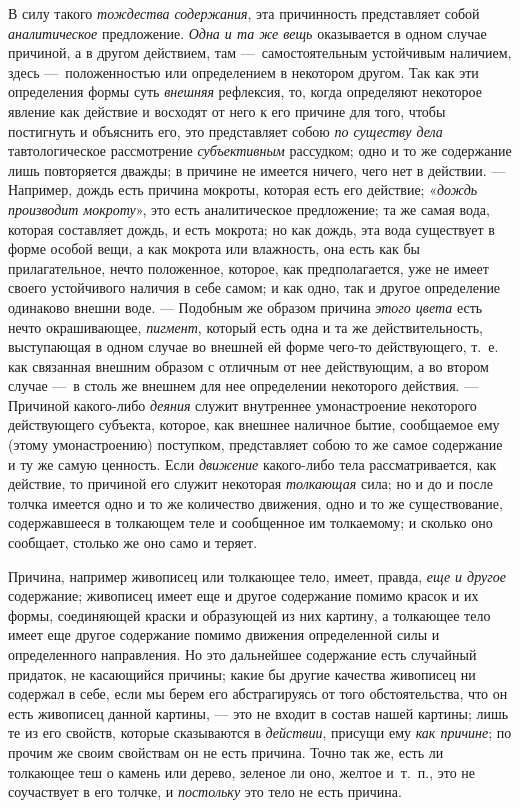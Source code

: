 В силу такого {\em тождества содержания}, эта
причинность представляет собой {\em аналитическое}
предложение. {\em Одна и та же вещь} оказывается в
одном случае причиной, а в другом действием, там —~самостоятельным
устойчивым наличием, здесь —~положенностью или определением в некотором
другом. Так как эти определения формы суть
{\em внешняя} рефлексия, то, когда определяют некоторое
явление как действие и восходят от него к его причине для того, чтобы
постигнуть и объяснить его, это представляет собою
{\em по существу дела} тавтологическое рассмотрение
{\em субъективным} рассудком; одно и то же содержание
лишь повторяется дважды; в причине не имеется ничего, чего нет в действии.
— Например, дождь есть причина мокроты, которая есть его действие;
«{\em дождь производит мокроту}», это есть
аналитическое предложение; та же самая вода, которая составляет дождь, и
есть мокрота; но как дождь, эта вода существует в форме особой вещи, а как
мокрота или влажность, она есть как бы прилагательное, нечто положенное,
которое, как предполагается, уже не имеет своего устойчивого наличия в себе
самом; и как одно, так и другое определение одинаково внешни воде. —
Подобным же образом причина {\em этого цвета} есть
нечто окрашивающее, {\em пигмент}, который есть одна и
та же действительность, выступающая в одном случае во внешней ей форме
чего-то действующего, т.~е. как связанная внешним образом с отличным от нее
действующим, а во втором случае —~в столь же внешнем для нее определении
некоторого действия. — Причиной какого-либо
{\em деяния} служит внутреннее умонастроение некоторого
действующего субъекта, которое, как внешнее наличное бытие, сообщаемое ему
(этому умонастроению) поступком, представляет собою то же самое содержание
и ту же самую ценность. Если {\em движение} какого-либо
тела рассматривается, как действие, то причиной его служит некоторая
{\em толкающая} сила; но и до и после толчка имеется
одно и то же количество движения, одно и то же существование, содержавшееся
в толкающем теле и сообщенное им толкаемому; и сколько оно сообщает,
столько же оно само и теряет.

Причина, например живописец или толкающее тело, имеет, правда,
{\em еще и другое} содержание; живописец имеет еще и
другое содержание помимо красок и их формы, соединяющей краски и образующей
из них картину, а толкающее тело имеет еще другое содержание помимо
движения определенной силы и определенного направления. Но это дальнейшее
содержание есть случайный придаток, не касающийся причины; какие бы другие
качества живописец ни содержал в себе, если мы берем его абстрагируясь от
того обстоятельства, что он есть живописец данной картины, — это не входит
в состав нашей картины; лишь те из его свойств, которые сказываются в
{\em действии}, присущи ему
{\em как причине}; по прочим же своим свойствам он не
есть причина. Точно так же, есть ли толкающее теш о камень или дерево,
зеленое ли оно, желтое и~т.~п., это не соучаствует в его толчке, и
{\em постольку} это тело не есть причина.

